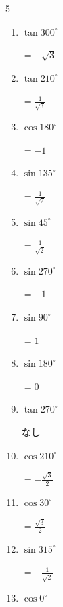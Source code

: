 \begin{multicols}{5}
\begin{enumerate}
        $\displaystyle =0$

  \item $\displaystyle \tan{300^\circ}$

        $\displaystyle =-\sqrt{3}$

  \item $\displaystyle \tan{210^\circ}$

        $\displaystyle =\frac{1}{\sqrt{3}}$

\columnbreak %

  \item $\displaystyle \cos{180^\circ}$

        $\displaystyle =-1$

  \item $\displaystyle \sin{135^\circ}$

        $\displaystyle =\frac{1}{\sqrt{2}}$

  \item $\displaystyle \sin{45^\circ}$

        $\displaystyle =\frac{1}{\sqrt{2}}$

  \item $\displaystyle \sin{270^\circ}$

        $\displaystyle =-1$

  \item $\displaystyle \sin{90^\circ}$

        $\displaystyle =1$

  \item $\displaystyle \sin{180^\circ}$

        $\displaystyle =0$

  \item $\displaystyle \tan{270^\circ}$

        $\displaystyle なし$

  \item $\displaystyle \cos{210^\circ}$

        $\displaystyle =-\frac{\sqrt{3}}{2}$

  \item $\displaystyle \cos{30^\circ}$

        $\displaystyle =\frac{\sqrt{3}}{2}$

  \item $\displaystyle \sin{315^\circ}$

        $\displaystyle =-\frac{1}{\sqrt{2}}$

  \item $\displaystyle \cos{0^\circ}$


\end{enumerate}
\end{multicols}
